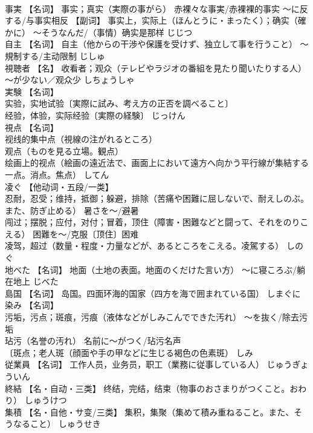 \documentclass[8pt]{extreport}
\begin{document}
\begin{CJK}{UTF8}{min}
\\	事実	【名词】 事实；真实（実際の事がら） 赤裸々な事実/赤裸裸的事实 ～に反する/与事实相反 【副词】 事实上，实际上（ほんとうに・まったく）；确实（確かに） ～そうなんだ/（事情）确实是那样	じじつ	
\\	自主	【名词】 自主（他からの干渉や保護を受けず、独立して事を行うこと） ～規制する/主动限制	じしゅ	
\\	視聴者	【名】 收看者；观众（テレビやラジオの番組を見たり聞いたりする人） ～が少ない／观众少	しちょうしゃ	
\\	実験	【名词】 
\\	实验，实地试验〔実際に試み、考え方の正否を調べること〕 
\\	经验，体验，实际经验〔実際の経験〕	じっけん	
\\	視点	【名词】 
\\	视线的集中点（視線の注がれるところ） 
\\	观点（ものを見る立場。観点） 
\\	绘画上的视点（絵画の遠近法で、画面上において遠方へ向かう平行線が集結する一点。消点。焦点）	してん	
\\	凌ぐ	【他动词・五段/一类】 
\\	忍耐，忍受；维持，抵御；躲避，排除（苦痛や困難に屈しないで、耐えしのぶ。また、防ぎ止める） 暑さを～/避暑 
\\	闯过；摆脱；应付，对付；冒着，顶住（障害・困難などと闘って、それをのりこえる） 困難を～/克服〔顶住〕困难 
\\	凌驾，超过（数量・程度・力量などが、あるところをこえる。凌駕する）	しのぐ	
\\	地べた	【名词】 地面（土地の表面。地面のくだけた言い方） ～に寝ころぶ/躺在地上	じべた	
\\	島国	【名词】 岛国。四面环海的国家（四方を海で囲まれている国）	しまぐに	
\\	染み	【名词】 
\\	污垢，污点；斑痕，污痕（液体などがしみこんでできた汚れ） ～を抜く/除去污垢 
\\	玷污（名誉の汚れ） 名前に～がつく/玷污名声 
\\	〔斑点；老人斑（顔面や手の甲などに生じる褐色の色素斑）	しみ	
\\	従業員	【名词】 工作人员，业务员，职工（業務に従事している人）	じゅうぎょういん	
\\	終結	【名・自动・三类】 终结，完结，结束（物事のおさまりがつくこと。おわり）	しゅうけつ	
\\	集積	【名・自他・サ变/三类】 集积，集聚（集めて積み重ねること。また、そうなること）	しゅうせき	

\end{CJK}
\end{document}
